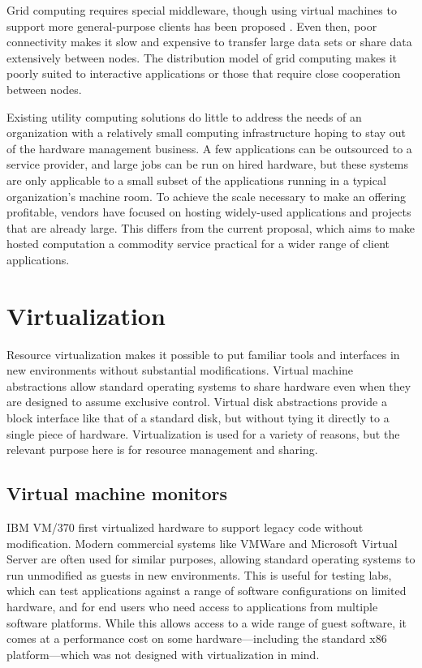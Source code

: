 Grid computing requires special middleware, though using virtual machines to support more general-purpose clients has been proposed \cite{figueiredo03,zhao04}. Even then, poor connectivity makes it slow and expensive to transfer large data sets or share data extensively between nodes. The distribution model of grid computing makes it poorly suited to interactive applications or those that require close cooperation between nodes.

Existing utility computing solutions do little to address the needs of an organization with a relatively small computing infrastructure hoping to stay out of the hardware management business. A few applications can be outsourced to a service provider, and large jobs can be run on hired hardware, but these systems are only applicable to a small subset of the applications running in a typical organization's machine room. To achieve the scale necessary to make an offering profitable, vendors have focused on hosting widely-used applications and projects that are already large. This differs from the current proposal, which aims to make hosted computation a commodity service practical for a wider range of client applications.

\section{Virtualization}

Resource virtualization makes it possible to put familiar tools and interfaces in new environments without substantial modifications. Virtual machine abstractions allow standard operating systems to share hardware even when they are designed to assume exclusive control. Virtual disk abstractions provide a block interface like that of a standard disk, but without tying it directly to a single piece of hardware. Virtualization is used for a variety of reasons, but the relevant purpose here is for resource management and sharing.

\subsection{Virtual machine monitors}

IBM VM/370 \cite{gum} first virtualized hardware to support legacy code without modification. Modern commercial systems like VMWare \cite{vmware} and Microsoft Virtual Server \cite{microsoftvm} are often used for similar purposes, allowing standard operating systems to run unmodified as guests in new environments. This is useful for testing labs, which can test applications against a range of software configurations on limited hardware, and for end users who need access to applications from multiple software platforms. While this allows access to a wide range of guest software, it comes at a performance cost on some hardware---including the standard x86 platform---which was not designed with virtualization in mind.

